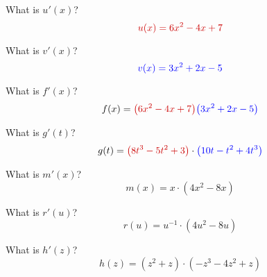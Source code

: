 
\begin{ProblemSet}[pencil space=2in]

 \begin{Problem}[pencil space=1in]
  What is $u'(x)$?
  \begin{equation*}
   \LeftStyle{u(x) = 6 x^2 - 4x + 7}
  \end{equation*}
 \end{Problem}

 \begin{Problem}[pencil space=1in]
  What is $v'(x)$?
  \begin{equation*}
   \textcolor{blue}{v(x) = 3 x^2 + 2 x - 5}
  \end{equation*}
 \end{Problem}

 \begin{Problem}[pencil space=3in]
  What is $f'(x)$?
  \begin{equation*}
   f(x) =
   \LeftStyle{\left(6 x^2 - 4x + 7\right)}
   \RightStyle{\left(3 x^2 + 2 x - 5\right)}
  \end{equation*}
 \end{Problem}

 \begin{Problem}
  What is $g'(t)$?
  \begin{equation*}
   g(t) = \LeftStyle{\left(8 t^3 - 5t^2 + 3\right)}\cdot\RightStyle{\left(10t - t^2 + 4t^3\right)}
  \end{equation*}
 \end{Problem}

 \begin{Problem}
  What is $m'(x)$?
  \begin{equation*}
   m(x) = x \cdot (4x^2 - 8x)
  \end{equation*}
 \end{Problem}

 \begin{Problem}
  What is $r'(u)$?
  \begin{equation*}
   r(u) = u^{-1} \cdot (4 u^2 - 8 u)
  \end{equation*}
 \end{Problem}

 \begin{Problem}
  What is $h'(z)$?
  \begin{equation*}
   h(z) = (z^2+z)\cdot\left(-z^3 - 4z^2 + z\right)
  \end{equation*}
 \end{Problem}


\end{ProblemSet}
